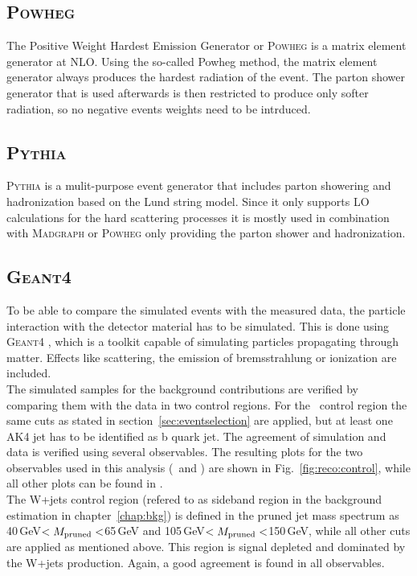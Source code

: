 \subsection*{\textsc{Powheg}}
The Positive Weight Hardest Emission Generator or \textsc{Powheg} is a matrix element generator at NLO. Using the so-called Powheg method, the matrix element generator always produces the hardest radiation of the event. The parton shower generator that is used afterwards is then restricted to produce only softer radiation, so no negative events weights need to be intrduced.
\subsection*{\textsc{Pythia}}
\textsc{Pythia} \cite{pythia} is a mulit-purpose event generator that includes parton showering and hadronization based on the Lund string model. Since it only supports LO calculations for the hard scattering processes it is mostly used in combination with \textsc{Madgraph} or \textsc{Powheg} only providing the parton shower and hadronization.
\subsection*{\textsc{Geant4}}
To be able to compare the simulated events with the measured data, the particle interaction with the detector material has to be simulated. This is done using \textsc{Geant4} \cite{geant4}, which is a toolkit capable of simulating particles propagating through matter. Effects like scattering, the emission of bremsstrahlung or ionization are included.\\

\noindent The simulated samples for the background contributions are verified by comparing them with the data in two control regions. For the \ttbar \ control region the same cuts as stated in section~\ref{sec:eventselection} are applied, but at least one AK4 jet has to be identified as b quark jet. The agreement of simulation and data is verified using several observables. The resulting plots for the two observables used in this analysis (\Mpr \ and \MWV) are shown in Fig.~\ref{fig:reco:control}, while all other plots can be found in \cite{PAS}.\\

\noindent The W+jets control region (refered to as sideband region in the background estimation in chapter~\ref{chap:bkg}) is defined in the pruned jet mass spectrum as 40\,GeV$<M_\mathrm{pruned}<$65\,GeV and 105\,GeV$<M_\mathrm{pruned}<$150\,GeV, while all other cuts are applied as mentioned above. This region is signal depleted and dominated by the W+jets production. Again, a good agreement is found in all observables.

